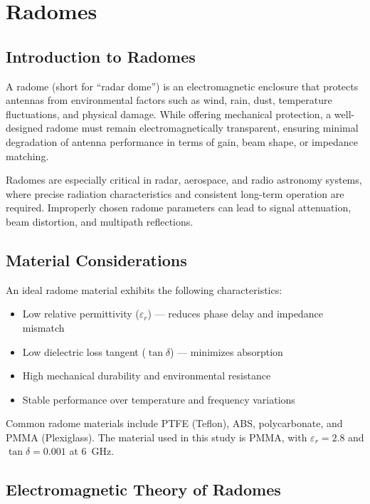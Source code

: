 \chapter{Radomes}

\section{Introduction to Radomes}

A radome (short for “radar dome”) is an electromagnetic enclosure that protects antennas from environmental factors such as wind, rain, dust, temperature fluctuations, and physical damage. While offering mechanical protection, a well-designed radome must remain electromagnetically transparent, ensuring minimal degradation of antenna performance in terms of gain, beam shape, or impedance matching.

Radomes are especially critical in radar, aerospace, and radio astronomy systems, where precise radiation characteristics and consistent long-term operation are required. Improperly chosen radome parameters can lead to signal attenuation, beam distortion, and multipath reflections.

\section{Material Considerations}

An ideal radome material exhibits the following characteristics:

\begin{itemize}
    \item Low relative permittivity ($\varepsilon_r$) — reduces phase delay and impedance mismatch
    \item Low dielectric loss tangent ($\tan\delta$) — minimizes absorption
    \item High mechanical durability and environmental resistance
    \item Stable performance over temperature and frequency variations
\end{itemize}

Common radome materials include PTFE (Teflon), ABS, polycarbonate, and PMMA (Plexiglass). The material used in this study is PMMA, with $\varepsilon_r = 2.8$ and $\tan\delta = 0.001$ at 6~GHz.

\section{Electromagnetic Theory of Radomes}

